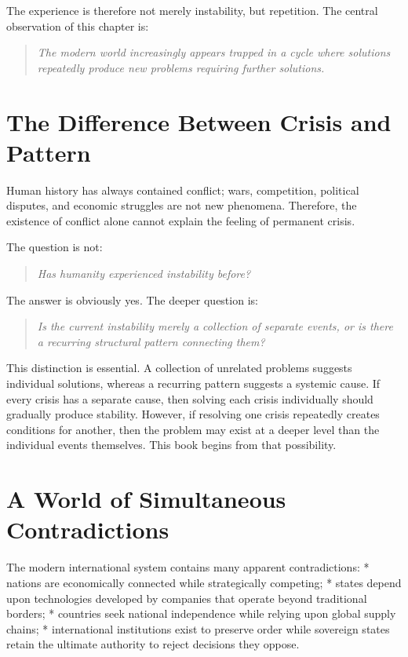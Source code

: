 \documentclass[11pt,openany]{book}
\theoremstyle{plain}
\theoremstyle{definition}
\begin{document}
The experience is therefore not merely instability, but repetition. The central observation of this chapter is:
\begin{quote}
\textit{The modern world increasingly appears trapped in a cycle where solutions repeatedly produce new problems requiring further solutions.}
\end{quote}

\section*{The Difference Between Crisis and Pattern}

Human history has always contained conflict; wars, competition, political disputes, and economic struggles are not new phenomena. Therefore, the existence of conflict alone cannot explain the feeling of permanent crisis.

The question is not:
\begin{quote}
\textit{Has humanity experienced instability before?}
\end{quote}
The answer is obviously yes. The deeper question is:
\begin{quote}
\textit{Is the current instability merely a collection of separate events, or is there a recurring structural pattern connecting them?}
\end{quote}

This distinction is essential. A collection of unrelated problems suggests individual solutions, whereas a recurring pattern suggests a systemic cause. If every crisis has a separate cause, then solving each crisis individually should gradually produce stability. However, if resolving one crisis repeatedly creates conditions for another, then the problem may exist at a deeper level than the individual events themselves. This book begins from that possibility.

\section*{A World of Simultaneous Contradictions}

The modern international system contains many apparent contradictions:
* nations are economically connected while strategically competing;
* states depend upon technologies developed by companies that operate beyond traditional borders;
* countries seek national independence while relying upon global supply chains;
* international institutions exist to preserve order while sovereign states retain the ultimate authority to reject decisions they oppose.
\end{document}
